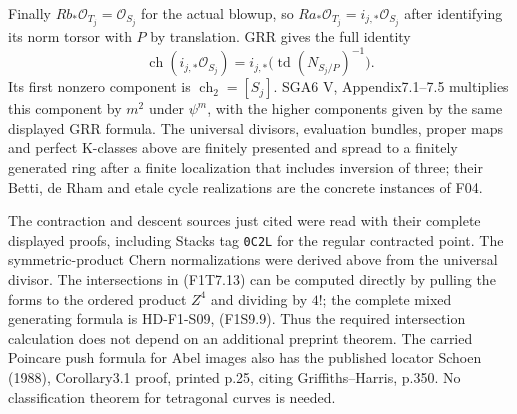 Finally $Rb_*\mathcal O_{T_j}=\mathcal O_{S_j}$ for the
actual blowup, so
$Ra_*\mathcal O_{T_j}=i_{j,*}\mathcal O_{S_j}$ after
identifying its norm torsor with $P$ by translation.
GRR gives the full identity
\[
 \operatorname{ch}(i_{j,*}\mathcal O_{S_j})
       =i_{j,*}\bigl(\operatorname{td}(N_{S_j/P})^{-1}\bigr).
 \tag{F1T7.17}
\]
Its first nonzero component is
$\operatorname{ch}_2=[S_j]$.
SGA6 V, Appendix7.1--7.5 multiplies this component
by $m^2$ under $\psi^m$, with the higher components
given by the same displayed GRR formula.
The universal divisors, evaluation bundles, proper maps
and perfect K-classes above are finitely presented and
spread to a finitely generated ring after a finite
localization that includes inversion of three;
their Betti, de Rham and etale cycle realizations are
the concrete instances of F04.

The contraction and descent sources just cited were read
with their complete displayed proofs, including
Stacks tag \texttt{0C2L} for the regular contracted point.
The symmetric-product Chern normalizations were derived
above from the universal divisor. The intersections in
(F1T7.13) can be computed directly by pulling the forms
to the ordered product $Z^4$ and dividing by $4!$;
the complete mixed generating formula is
HD-F1-S09, (F1S9.9). Thus the required intersection
calculation does not depend on an additional preprint
theorem. The carried Poincare push formula for Abel images
also has the published locator Schoen (1988),
Corollary3.1 proof, printed p.25, citing
Griffiths--Harris, p.350.
No classification theorem for tetragonal curves is needed.
